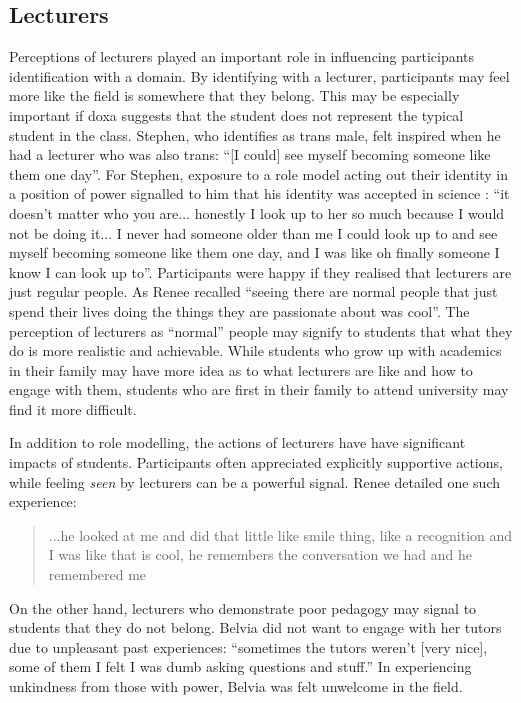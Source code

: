 \subsection{Lecturers}
Perceptions of lecturers played an important role in influencing participants identification with a domain. By identifying with a lecturer, participants may feel more like the field is somewhere that they belong. This may be especially important if doxa suggests that the student does not represent the typical student in the class. Stephen, who identifies as trans male, felt inspired when he had a lecturer who was also trans: ``[I could] see myself becoming someone like them one day''. For Stephen, exposure to a role model acting out their identity in a position of power signalled to him that his identity was accepted in science : ``it doesn't matter who you are... honestly I look up to her so much because I would not be doing it... I never had someone older than me I could look up to and see myself becoming someone like them one day, and I was like oh finally someone I know I can look up to''. Participants were happy if they realised that lecturers are just regular people. As Renee recalled ``seeing there are normal people that just spend their lives doing the things they are passionate about was cool''. The perception of lecturers as ``normal'' people may signify to students that what they do is more realistic and achievable. While students who grow up with academics in their family may have more idea as to what lecturers are like and how to engage with them, students who are first in their family to attend university may find it more difficult.  

In addition to role modelling, the actions of lecturers have have significant impacts of students. Participants often appreciated explicitly supportive actions, while feeling \textit{seen} by lecturers can be a powerful signal. Renee detailed one such experience: \blockquote{...he looked at me and did that little like smile thing, like a recognition and I was like that is cool, he remembers the conversation we had and he remembered me} On the other hand, lecturers who demonstrate poor pedagogy may signal to students that they do not belong. Belvia did not want to engage with her tutors due to unpleasant past experiences: ``sometimes the tutors weren't [very nice], some of them I felt I was dumb asking questions and stuff.'' In experiencing unkindness from those with power, Belvia was felt unwelcome in the field.  



